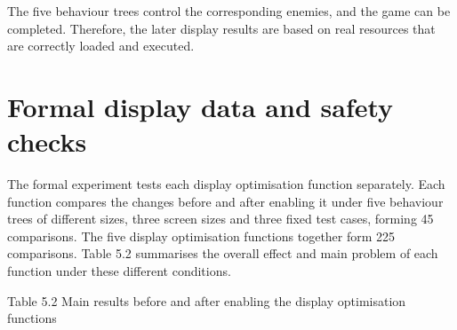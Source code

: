 The five behaviour trees control the corresponding enemies, and the game can be completed. Therefore, the later display results are based on real resources that are correctly loaded and executed.

\section{Formal display data and safety checks}

The formal experiment tests each display optimisation function separately. Each function compares the changes before and after enabling it under five behaviour trees of different sizes, three screen sizes and three fixed test cases, forming 45 comparisons. The five display optimisation functions together form 225 comparisons. Table 5.2 summarises the overall effect and main problem of each function under these different conditions.

Table 5.2 Main results before and after enabling the display optimisation functions

